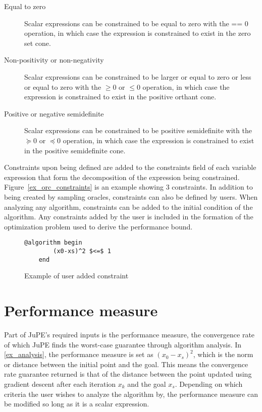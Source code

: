\begin{description}
	\item[Equal to zero] Scalar expressions can be constrained to be equal to zero with the == 0 operation, in which case the expression is constrained to exist in the zero set cone.
	\item[Non-positivity or non-negativity] Scalar expressions can be constrained to be larger or equal to zero or less or equal to zero with the $\geq 0$ or $\leq 0$ operation, in which case the expression is constrained to exist in the positive orthant cone.
	\item[Positive or negative semidefinite] Scalar expressions can be constrained to be positive semidefinite with the $\succeq 0$ or $\preceq 0$ operation, in which case the expression is constrained to exist in the positive semidefinite cone.
\end{description}

Constraints upon being defined are added to the constraints field of each variable expression that form the decomposition of the expression being constrained. Figure~\ref{ex_orc_constraints} is an example showing 3 constraints. In addition to being created by sampling oracles, constraints can also be defined by users. When analyzing any algorithm, constraints can be added to the initial condition of the algorithm. Any constraints added by the user is included in the formation of the optimization problem used to derive the performance bound.

\begin{figure}[h]
	\begin{lstlisting}[mathescape]
	@algorithm begin
		(x0-xs)^2 $<=$ 1
	end
	\end{lstlisting}
	\caption{Example of user added constraint}
	\label{ex_user_constraints}
\end{figure}

\section{Performance measure}
Part of JuPE's required inputs is the performance measure, the convergence rate of which JuPE finds the worst-case guarantee through algorithm analysis. In \ref{ex_analysis}, the performance measure is set as $ (x_0 - x_s) ^2 $, which is the norm or distance between the initial point and the goal. This means the convergence rate guarantee returned is that of the distance between the point updated using gradient descent after each iteration $ x_k $ and the goal $ x_s $. Depending on which criteria the user wishes to analyze the algorithm by, the performance measure can be modified so long as it is a scalar expression.

